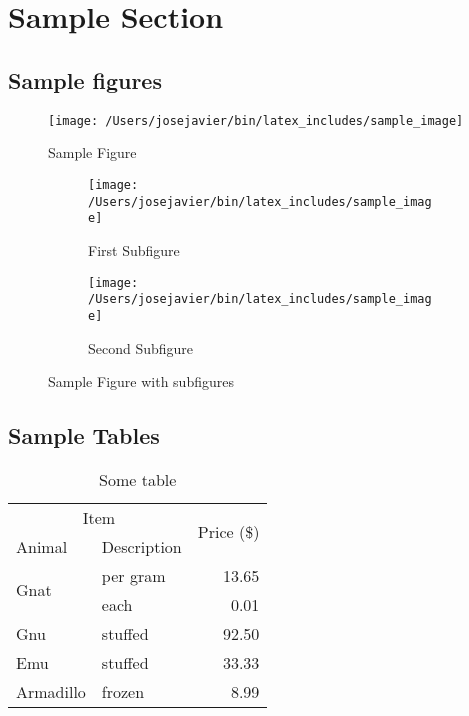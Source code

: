 \documentclass[a4paper]{article}
\title{\HWTitle \\ \vspace{.25cm}}
\date{\HWDueDate}
\author{\HWAuthorName}
\begin{document}
\maketitle


\hfill

\section{Sample Section} %
\label{sec:sample_section}

\subsection{Sample figures} %
\label{sub:sample_figures}


\begin{figure}[htp]
  \centering
    \texttt{[image: /Users/josejavier/bin/latex\_includes/sample\_image]}
    \caption{Sample Figure}
    \label{fig:sample fig}
\end{figure}

\begin{figure}[htp]
  \centering
  \begin{subfigure}{.45\textwidth}
    \centering
    \caption{First Subfigure}
    \texttt{[image: /Users/josejavier/bin/latex\_includes/sample\_image]}
    \label{fig:samplesubfiga}
  \end{subfigure}%
  \hfill
  \begin{subfigure}{.45\textwidth}
    \centering
    \caption{Second Subfigure}
    \texttt{[image: /Users/josejavier/bin/latex\_includes/sample\_image]}
    \label{fig:samplesubfigb}
  \end{subfigure}
  \caption{Sample Figure with subfigures}
  \label{fig:samplesubfig}
\end{figure}

\subsection{Sample Tables} %
\label{sub:sample_tables}

\begin{table}[htp]
\centering
\renewcommand{\arraystretch}{1.2}
\begin{tabular}{llr}
\toprule
\multicolumn{2}{c}{Item} & \multirow{2}{*}{Price (\$)} \\
\cmidrule(r){1-2}
Animal    & Description &   \\
\midrule
\multirow{2}{*}{Gnat}      & per gram    & 13.65      \\
          &    each     & 0.01       \\
Gnu       & stuffed     & 92.50      \\
Emu       & stuffed     & 33.33      \\
Armadillo & frozen      & 8.99       \\
\bottomrule
\end{tabular}
\caption{Some table }
\label{tab:sample table}
\end{table}
\end{document}
